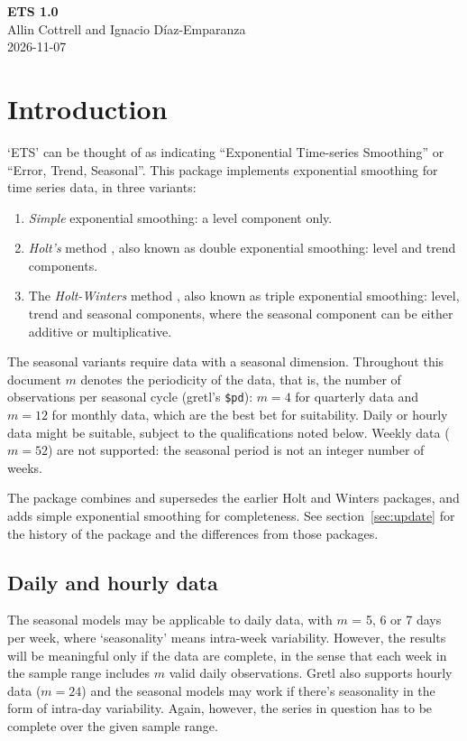 \documentclass{article}
\begin{document}
\begin{center}
  {\Large \textbf{ETS 1.0}} \\[6pt]
  Allin Cottrell and Ignacio Díaz-Emparanza \\[6pt]
  2026-11-07
\end{center}

\section{Introduction}
\label{sec:intro}

`\textsf{ETS}' can be thought of as indicating ``Exponential Time-series
Smoothing'' or ``Error, Trend, Seasonal''.  This package implements
exponential smoothing for time series data, in three variants:
\begin{enumerate}
\item \textit{Simple} exponential smoothing: a level component only.
\item \textit{Holt's} method \citep{holt57}, also known as double
  exponential smoothing: level and trend components.
\item The \textit{Holt-Winters} method \citep{winters60}, also known as
  triple exponential smoothing: level, trend and seasonal components,
  where the seasonal component can be either additive or multiplicative.
\end{enumerate}
The seasonal variants require data with a seasonal dimension. Throughout
this document $m$ denotes the periodicity of the data, that is, the
number of observations per seasonal cycle (gretl's \verb|$pd|):
$m=4$ for quarterly data and
$m=12$ for monthly data, which are the best bet for suitability. Daily
or hourly data might be suitable, subject to the qualifications noted
below.  Weekly data
($m=52$) are not supported: the seasonal period is not an integer number
of weeks.

The package combines and supersedes the earlier \textsf{Holt} and
\textsf{Winters} packages, and adds simple exponential smoothing for
completeness. See section~\ref{sec:update} for the history of the
package and the differences from those packages.

\subsection{Daily and hourly data}

The seasonal models may be applicable to daily data, with $m$ = 5, 6 or
7 days per week, where `seasonality' means intra-week
variability. However, the results will be meaningful only if the data
are complete, in the sense that each week in the sample range includes
$m$ valid daily observations.  Gretl also supports hourly data ($m=24$)
and the seasonal models may work if there's seasonality in the form of
intra-day variability. Again, however, the series in question has to be
complete over the given sample range.
\end{document}
